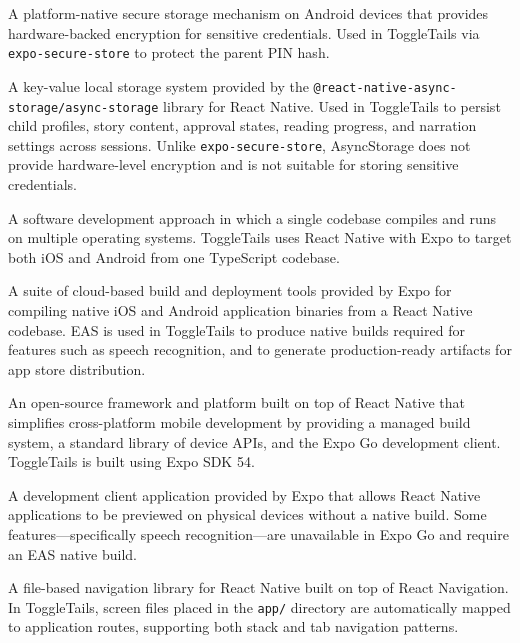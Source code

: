 \begin{description}[leftmargin=2.5cm, style=nextline]

\item[\textbf{Android Keystore}]
A platform-native secure storage mechanism on Android devices that provides
hardware-backed encryption for sensitive credentials. Used in ToggleTails
via \texttt{expo-secure-store} to protect the parent PIN hash.

\item[\textbf{AsyncStorage}]
A key-value local storage system provided by the
\texttt{@react-native-async-storage/async-storage} library for React Native.
Used in ToggleTails to persist child profiles, story content, approval states,
reading progress, and narration settings across sessions. Unlike
\texttt{expo-secure-store}, AsyncStorage does not provide hardware-level
encryption and is not suitable for storing sensitive credentials.

\item[\textbf{Cross-Platform Development}]
A software development approach in which a single codebase compiles and runs
on multiple operating systems. ToggleTails uses React Native with Expo to
target both iOS and Android from one TypeScript codebase.

\item[\textbf{EAS (Expo Application Services)}]
A suite of cloud-based build and deployment tools provided by Expo for
compiling native iOS and Android application binaries from a React Native
codebase. EAS is used in ToggleTails to produce native builds required for
features such as speech recognition, and to generate production-ready
artifacts for app store distribution.

\item[\textbf{Expo}]
An open-source framework and platform built on top of React Native that
simplifies cross-platform mobile development by providing a managed build
system, a standard library of device APIs, and the Expo Go development client.
ToggleTails is built using Expo SDK 54.

\item[\textbf{Expo Go}]
A development client application provided by Expo that allows React Native
applications to be previewed on physical devices without a native build. Some
features—specifically speech recognition—are unavailable in Expo Go and
require an EAS native build.

\item[\textbf{Expo Router}]
A file-based navigation library for React Native built on top of React
Navigation. In ToggleTails, screen files placed in the \texttt{app/}
directory are automatically mapped to application routes, supporting both
stack and tab navigation patterns.


\end{description}
